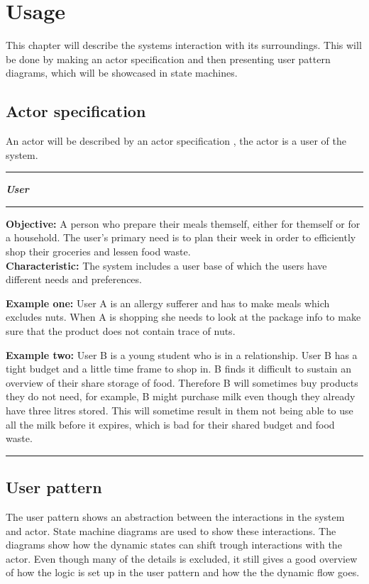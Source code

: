 \section{Usage}\label{Usage}
This chapter will describe the systems interaction with its surroundings. This will be done by making an actor specification and then presenting user pattern diagrams, which will be showcased in state machines.

\subsection{Actor specification}
\label{Actor_specification}
An actor will be described by an actor specification , the actor is a user of the system.

\hrule
\begin{tightcenter}
\textit{\textbf{User}}
\end{tightcenter}
\hrule
\textbf{Objective:} A person who prepare their meals themself, either for themself or for a household. The user's primary need is to plan their week in order to efficiently shop their groceries and lessen food waste.\\

\textbf{Characteristic:} The system includes a user base of which the users have different needs and preferences.

\textbf{Example one:} User A is an allergy sufferer and has to make meals which excludes nuts. When A is shopping she needs to look at the package info to make sure that the product does not contain trace of nuts.

\textbf{Example two:} User B is a young student who is in a relationship. User B has a tight budget and a little time frame to shop in. B finds it difficult to sustain an overview of their share storage of food. Therefore B will sometimes buy products they do not need, for example, B might purchase milk even though they already have three litres stored. This will sometime result in them not being able to use all the milk before it expires, which is bad for their shared budget and food waste.
\hrule



\subsection{User pattern}
The user pattern shows an abstraction between the interactions in the system and actor. State machine diagrams are used to show these interactions. The diagrams show how the dynamic states can shift trough interactions with the actor. Even though many of the details is excluded, it still gives a good overview of how the logic is set up in the user pattern and how the the dynamic flow goes. 

